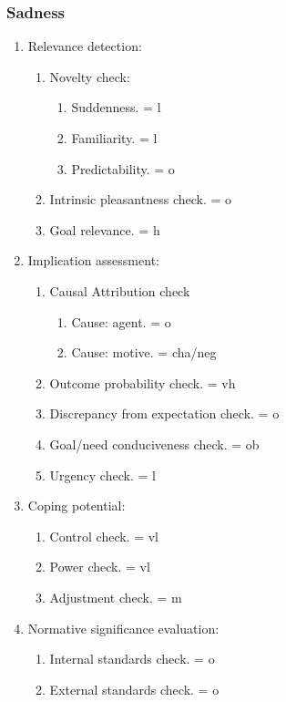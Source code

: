 {{\subsubsection{Sadness}

\begin{enumerate}
\item  Relevance detection:
\begin{enumerate}
\item  Novelty check:
\begin{enumerate}
\item  Suddenness. = l
\item  Familiarity. = l
\item  Predictability. = o
\end{enumerate}
\item  Intrinsic pleasantness check. = o
\item  Goal relevance. = h
\end{enumerate}
\item  Implication assessment:
\begin{enumerate}
\item  Causal Attribution check
\begin{enumerate}
\item  Cause: agent. = o
\item  Cause: motive. = cha/neg
\end{enumerate}
\item  Outcome probability check. = vh
\item  Discrepancy from expectation check. = o
\item  Goal/need conduciveness check. = ob
\item  Urgency check. = l
\end{enumerate}
\item  Coping potential:
\begin{enumerate}
\item  Control check. = vl
\item  Power check. = vl
\item  Adjustment check. = m
\end{enumerate}
\item  Normative significance evaluation:
\begin{enumerate}
\item  Internal standards check. = o
\item  External standards check. = o
\end{enumerate}
\end{enumerate}

}}
